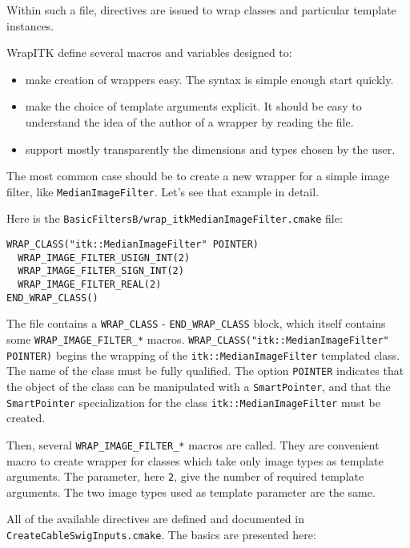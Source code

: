 \documentclass{InsightArticle}
\begin{document}
Within such a file, directives are issued to wrap classes and particular
template instances. 

WrapITK define several macros and variables designed to:
\begin{itemize}
  \item make creation of wrappers easy. The syntax is simple enough start quickly.
  \item make the choice of template arguments explicit. It should be easy to understand
the idea of the author of a wrapper by reading the file.
  \item support mostly transparently the dimensions and types chosen by the user.
\end{itemize}

The most common case should be to create a new wrapper for a simple image filter, like 
\verb$MedianImageFilter$. Let's see that example in detail.

Here is the \verb$BasicFiltersB/wrap_itkMedianImageFilter.cmake$ file:

\small \begin{verbatim}
WRAP_CLASS("itk::MedianImageFilter" POINTER)
  WRAP_IMAGE_FILTER_USIGN_INT(2)
  WRAP_IMAGE_FILTER_SIGN_INT(2)
  WRAP_IMAGE_FILTER_REAL(2)
END_WRAP_CLASS()
\end{verbatim} \normalsize

The file contains a \verb$WRAP_CLASS$ - \verb$END_WRAP_CLASS$ block, which itself contains
some \verb$WRAP_IMAGE_FILTER_*$ macros. \verb$WRAP_CLASS("itk::MedianImageFilter" POINTER)$
begins the wrapping of the \verb$itk::MedianImageFilter$ templated class. The name of the class
must be fully qualified. The option \verb$POINTER$ indicates that the object of the class can be
manipulated with a \verb$SmartPointer$, and that the \verb$SmartPointer$ specialization for
the class \verb$itk::MedianImageFilter$ must be created.

Then, several \verb$WRAP_IMAGE_FILTER_*$ macros are called. They are convenient macro to
create wrapper for classes which take only image types as template arguments. The parameter,
here \verb$2$, give the number of required template arguments. The two image types used as
template parameter are the same.

All of the available directives are defined and documented
in \verb$CreateCableSwigInputs.cmake$. The basics are presented here:
\end{document}
